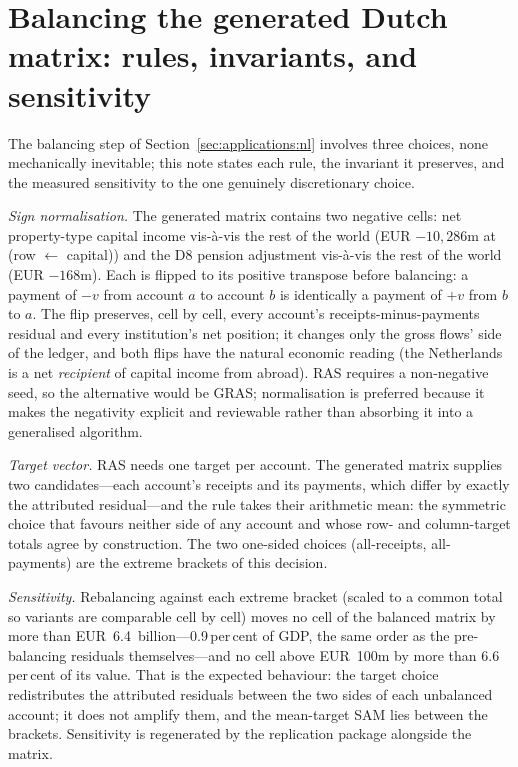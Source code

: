 \section{Balancing the generated Dutch matrix: rules, invariants, and
sensitivity}\label{app:nlbalance}

The balancing step of Section~\ref{sec:applications:nl} involves three
choices, none mechanically inevitable; this note states each rule, the
invariant it preserves, and the measured sensitivity to the one genuinely
discretionary choice.

\emph{Sign normalisation.} The generated matrix contains two negative
cells: net property-type capital income vis-\`a-vis the rest of the world
(EUR $-10{,}286$m at (row $\leftarrow$ capital)) and the D8 pension
adjustment vis-\`a-vis the rest of the world (EUR $-168$m). Each is
flipped to its positive transpose before balancing: a payment of $-v$
from account $a$ to account $b$ is identically a payment of $+v$ from
$b$ to $a$. The flip preserves, cell by cell, every account's
receipts-minus-payments residual and every institution's net position;
it changes only the gross flows' side of the ledger, and both flips have
the natural economic reading (the Netherlands is a net \emph{recipient}
of capital income from abroad). RAS requires a non-negative seed, so the
alternative would be GRAS; normalisation is preferred because it makes
the negativity explicit and reviewable rather than absorbing it into a
generalised algorithm.

\emph{Target vector.} RAS needs one target per account. The generated
matrix supplies two candidates---each account's receipts and its
payments, which differ by exactly the attributed residual---and the rule
takes their arithmetic mean: the symmetric choice that favours neither
side of any account and whose row- and column-target totals agree by
construction. The two one-sided choices (all-receipts, all-payments) are
the extreme brackets of this decision.

\emph{Sensitivity.} Rebalancing against each extreme bracket (scaled to
a common total so variants are comparable cell by cell) moves no cell of
the balanced matrix by more than EUR~6.4~billion---0.9\,per\,cent of
GDP, the same order as the pre-balancing residuals themselves---and no
cell above EUR~100m by more than 6.6\,per\,cent of its value. That is
the expected behaviour: the target choice redistributes the attributed
residuals between the two sides of each unbalanced account; it does not
amplify them, and the mean-target SAM lies between the brackets.
Sensitivity is regenerated by the replication package alongside the
matrix.

